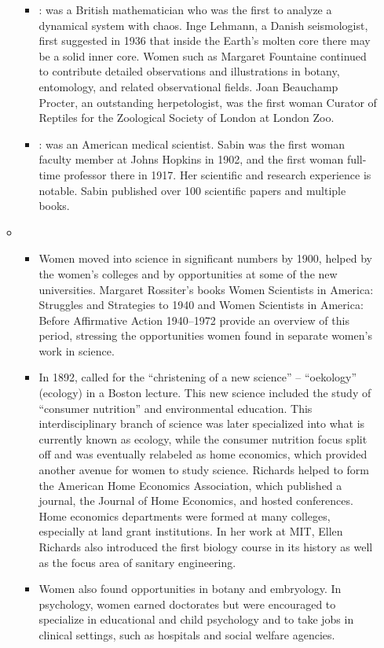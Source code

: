\documentclass[12pt,a4paper]{article}
\begin{document}
\begin{enumerate}
\begin{itemize}
\begin{itemize}
        \item {}: was a British mathematician who was the first to analyze a dynamical system with chaos. Inge Lehmann, a Danish seismologist, first suggested in 1936 that inside the Earth's molten core there may be a solid inner core. Women such as Margaret Fountaine continued to contribute detailed observations and illustrations in botany, entomology, and related observational fields. Joan Beauchamp Procter, an outstanding herpetologist, was the first woman Curator of Reptiles for the Zoological Society of London at London Zoo.
        \item {}: was an American medical scientist. Sabin was the first woman faculty member at Johns Hopkins in 1902, and the first woman full-time professor there in 1917. Her scientific and research experience is notable. Sabin published over 100 scientific papers and multiple books.
      \end{itemize}
      \item {}
      \begin{itemize}
        \item Women moved into science in significant numbers by 1900, helped by the women's colleges and by opportunities at some of the new universities. Margaret Rossiter's books Women Scientists in America: Struggles and Strategies to 1940 and Women Scientists in America: Before Affirmative Action 1940–1972 provide an overview of this period, stressing the opportunities women found in separate women's work in science.
        \item In 1892,  called for the ``christening of a new science'' – ``oekology'' (ecology) in a Boston lecture. This new science included the study of ``consumer nutrition'' and environmental education. This interdisciplinary branch of science was later specialized into what is currently known as ecology, while the consumer nutrition focus split off and was eventually relabeled as home economics, which provided another avenue for women to study science. Richards helped to form the American Home Economics Association, which published a journal, the Journal of Home Economics, and hosted conferences. Home economics departments were formed at many colleges, especially at land grant institutions. In her work at MIT, Ellen Richards also introduced the first biology course in its history as well as the focus area of sanitary engineering.
        \item Women also found opportunities in botany and embryology. In psychology, women earned doctorates but were encouraged to specialize in educational and child psychology and to take jobs in clinical settings, such as hospitals and social welfare agencies.

\end{itemize}
\end{itemize}
\end{enumerate}
\end{document}
